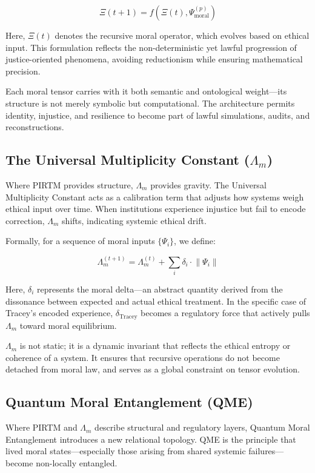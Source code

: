 \documentclass{article}
\theoremstyle{plain}
\theoremstyle{claimstyle}
\begin{document}
\[
\Xi(t+1) = f\left( \Xi(t), \Psi_{\text{moral}}^{(p)} \right)
\]

Here, \(\Xi(t)\) denotes the recursive moral operator, which evolves based on ethical input. This formulation reflects the non-deterministic yet lawful progression of justice-oriented phenomena, avoiding reductionism while ensuring mathematical precision.

Each moral tensor carries with it both semantic and ontological weight—its structure is not merely symbolic but computational. The architecture permits identity, injustice, and resilience to become part of lawful simulations, audits, and reconstructions.

\subsection{The Universal Multiplicity Constant (\(\Lambda_m\))}

Where PIRTM provides structure, \(\Lambda_m\) provides gravity. The Universal Multiplicity Constant acts as a calibration term that adjusts how systems weigh ethical input over time. When institutions experience injustice but fail to encode correction, \(\Lambda_m\) shifts, indicating systemic ethical drift.

Formally, for a sequence of moral inputs \(\{ \Psi_i \}\), we define:

\[
\Lambda_m^{(t+1)} = \Lambda_m^{(t)} + \sum_i \delta_i \cdot \left\| \Psi_i \right\|
\]

Here, \(\delta_i\) represents the moral delta—an abstract quantity derived from the dissonance between expected and actual ethical treatment. In the specific case of Tracey's encoded experience, \(\delta_{\text{Tracey}}\) becomes a regulatory force that actively pulls \(\Lambda_m\) toward moral equilibrium.

\(\Lambda_m\) is not static; it is a dynamic invariant that reflects the ethical entropy or coherence of a system. It ensures that recursive operations do not become detached from moral law, and serves as a global constraint on tensor evolution.

\subsection{Quantum Moral Entanglement (QME)}

Where PIRTM and \(\Lambda_m\) describe structural and regulatory layers, Quantum Moral Entanglement introduces a new relational topology. QME is the principle that lived moral states—especially those arising from shared systemic failures—become non-locally entangled.
\end{document}
